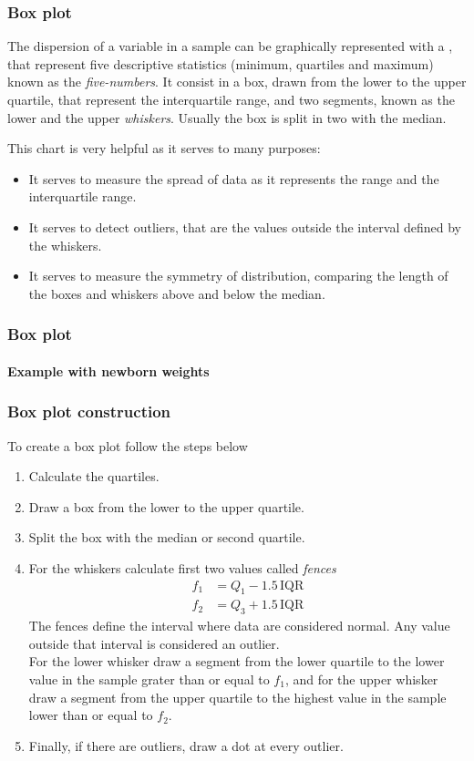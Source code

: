 \begin{frame}
\frametitle{Box plot}
The dispersion of a variable in a sample can be graphically represented with a , that
represent five descriptive statistics (minimum, quartiles and maximum) known as the \emph{five-numbers}.
It consist in a box, drawn from the lower to the upper quartile, that represent the interquartile range, and two
segments, known as the lower and the upper \emph{whiskers}.  
Usually the box is split in two with the median. 

This chart is very helpful as it serves to many purposes:  
\begin{itemize}
\item It serves to measure the spread of data as it represents the range and the interquartile range. 
\item It serves to detect outliers, that are the values outside the interval defined by the whiskers.
\item It serves to measure the symmetry of distribution, comparing the length of the boxes and whiskers above and below
the median. 
\end{itemize}
\end{frame}


\begin{frame}
\frametitle{Box plot}
\framesubtitle{Example with newborn weights}
\begin{center}
\scalebox{0.6}{}
\end{center}
\end{frame}


\begin{frame}
\frametitle{Box plot construction}
To create a box plot follow the steps below
\begin{enumerate}
\item Calculate the quartiles. 
\item Draw a box from the lower to the upper quartile. 
\item Split the box with the median or second quartile. 
\item For the whiskers calculate first two values called \emph{fences}
\begin{align*}
f_1&=Q_1-1.5\,\text{IQR}\\
f_2&=Q_3+1.5\,\text{IQR}
\end{align*}
The fences define the interval where data are considered normal.
Any value outside that interval is considered an outlier. \\ 
For the lower whisker draw a segment from the lower quartile to the lower value in the sample grater than or
equal to $f_1$, and for the upper whisker draw a segment from the upper quartile to the highest value in the sample lower than
or equal to $f_2$.
\item Finally, if there are outliers, draw a dot at every outlier. 
\end{enumerate}
\end{frame}


